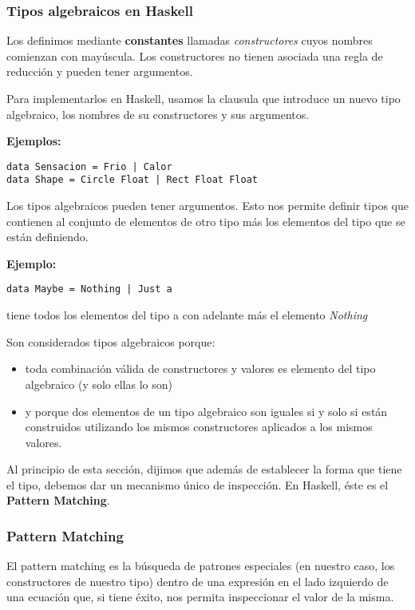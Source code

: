\subsubsection{Tipos algebraicos en Haskell}
Los definimos mediante \textbf{constantes} llamadas \textit{constructores} cuyos nombres comienzan con mayúscula. Los constructores no tienen asociada una regla de reducción y pueden tener argumentos.

Para implementarlos en Haskell, usamos la clausula  que introduce un nuevo tipo algebraico, los nombres de su constructores y sus argumentos.

\textbf{Ejemplos:}
\begin{centrado}
	\begin{verbatim}
data Sensacion = Frio | Calor
data Shape = Circle Float | Rect Float Float
	\end{verbatim}
\end{centrado}

Los tipos algebraicos pueden tener argumentos. Esto nos permite definir tipos que contienen al conjunto de elementos de otro tipo más los elementos del tipo que se están definiendo.

\textbf{Ejemplo:}
\begin{centrado}
	\begin{verbatim}
data Maybe = Nothing | Just a
	\end{verbatim}
\end{centrado}
 tiene todos los elementos del tipo a con  adelante más el elemento \textit{Nothing}

\vspace*{5mm}

Son considerados tipos algebraicos porque:
\begin{itemize}
	\item toda combinación válida de constructores y valores es elemento del tipo algebraico (y solo ellas lo son)
	\item y porque dos elementos de un tipo algebraico son iguales si y solo si están construidos utilizando los mismos constructores aplicados a los mismos valores.
\end{itemize}
Al principio de esta sección, dijimos que además de establecer la forma que tiene el tipo, debemos dar un mecanismo único de inspección. En Haskell, éste es el \textbf{Pattern Matching}.


\subsubsection{Pattern Matching}
El pattern matching es la búsqueda de patrones especiales (en nuestro caso, los constructores de nuestro tipo) dentro de una expresión en el lado izquierdo de una ecuación que, si tiene éxito, nos permita inspeccionar el valor de la misma.

